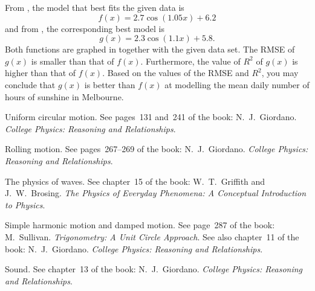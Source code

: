 \documentclass[a4paper,oneside,12pt]{article}
\begin{document}
\begin{problem}
{\begin{solution}
From ,
the model that best fits the given data is
\begin{equation}
\label{eqn:trigonometric:mean_daily_sunshine_f(x)}
f(x)
=
2.7 \cos(1.05 x) + 6.2
\end{equation}
and
from ,
the corresponding best model is
\begin{equation}
\label{eqn:trigonometric:mean_daily_sunshine_g(x)}
g(x)
=
2.3 \cos(1.1 x) + 5.8.
\end{equation}
Both functions are graphed in
 together with
the given data set.  The RMSE of $g(x)$ is smaller than that of
$f(x)$.  Furthermore, the value of $R^2$ of $g(x)$ is higher than that
of $f(x)$.  Based on the values of the RMSE and $R^2$, you may
conclude that $g(x)$ is better than $f(x)$ at modelling the mean daily
number of hours of sunshine in Melbourne.
\end{solution}
}{}

\item Uniform circular motion.  See pages~131 and~241 of the book:
  N.~J.~Giordano.  \emph{College Physics: Reasoning and Relationships}.

\item Rolling motion.  See pages~267--269 of the book:
  N.~J.~Giordano.  \emph{College Physics: Reasoning and Relationships}.

\item The physics of waves.  See chapter~15 of the book:
  W.~T.~Griffith and J.~W.~Brosing.  \emph{The Physics of Everyday
    Phenomena: A Conceptual Introduction to Physics}.

\item Simple harmonic motion and damped motion.  See page~287 of the
  book: M.~Sullivan.  \emph{Trigonometry: A Unit Circle Approach}.
  See also chapter~11 of the book:  N.~J.~Giordano.
  \emph{College Physics: Reasoning and Relationships}.

\item Sound.  See chapter~13 of the book:  N.~J.~Giordano.
  \emph{College Physics: Reasoning and Relationships}.
\end{problem}
\end{document}
